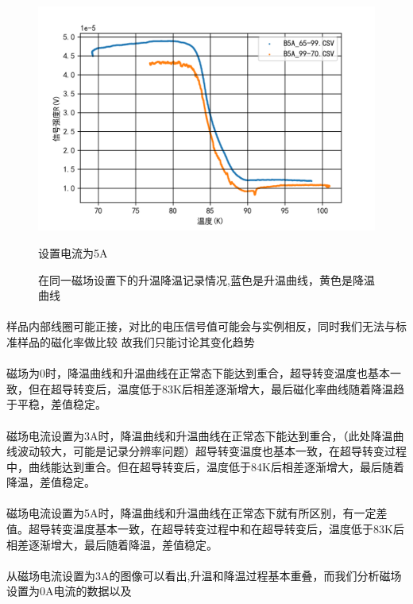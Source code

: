\documentclass{ctexart}
\theoremstyle{ansstyle}
\begin{document}
\begin{figure}[H]
\begin{minipage}[t]{0.6\linewidth}
        \includegraphics[width=0.9\linewidth]{./png/8.png}
        \caption{设置电流为5A}
    \end{minipage}
    \caption{在同一磁场设置下的升温降温记录情况,蓝色是升温曲线，黄色是降温曲线}

\end{figure}
\paragraph{}样品内部线圈可能正接，对比的电压信号值可能会与实例相反，同时我们无法与标准样品的磁化率做比较
故我们只能讨论其变化趋势\\
\paragraph{}磁场为0时，降温曲线和升温曲线在正常态下能达到重合，超导转变温度也基本一致，但在超导转变后，温度低于83K后相差逐渐增大，最后磁化率曲线随着降温趋于平稳，差值稳定。\\
\paragraph{}磁场电流设置为3A时，降温曲线和升温曲线在正常态下能达到重合，（此处降温曲线波动较大，可能是记录分辨率问题）超导转变温度也基本一致，在超导转变过程中，曲线能达到重合。但在超导转变后，温度低于84K后相差逐渐增大，最后随着降温，差值稳定。\\
\paragraph{}磁场电流设置为5A时，降温曲线和升温曲线在正常态下就有所区别，有一定差值。超导转变温度基本一致，在超导转变过程中和在超导转变后，温度低于83K后相差逐渐增大，最后随着降温，差值稳定。
\paragraph{}
从磁场电流设置为3A的图像可以看出,升温和降温过程基本重叠，而我们分析磁场设置为0A电流的数据以及
\end{document}
